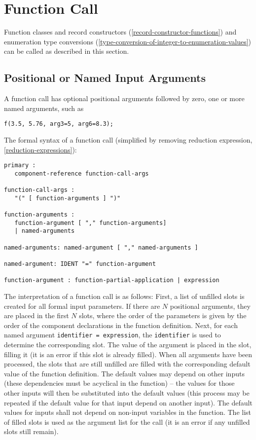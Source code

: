 \section{Function Call}\label{function-call}

Function classes and record constructors (\cref{record-constructor-functions}) and enumeration type
conversions (\cref{type-conversion-of-integer-to-enumeration-values}) can be called as described in this section.

\subsection{Positional or Named Input Arguments}\label{positional-or-named-input-arguments-of-functions}

A function call has optional positional arguments followed by zero, one
or more named arguments, such as

\begin{lstlisting}[language=modelica]
f(3.5, 5.76, arg3=5, arg6=8.3);
\end{lstlisting}

The formal syntax of a function call (simplified by removing reduction
expression, \cref{reduction-expressions}):
\begin{lstlisting}[language=grammar]
primary :
   component-reference function-call-args

function-call-args :
   "(" [ function-arguments ] ")"

function-arguments :
   function-argument [ "," function-arguments]
   | named-arguments

named-arguments: named-argument [ "," named-arguments ]

named-argument: IDENT "=" function-argument

function-argument : function-partial-application | expression
\end{lstlisting}

The interpretation of a function call is as follows: First, a list of unfilled slots is created for all formal input parameters.
If there are $N$ positional arguments, they are placed in the first $N$ slots, where the order of the parameters is given by the order of the component declarations in the function definition.
Next, for each named argument \lstinline!identifier = expression!, the \lstinline!identifier! is used to determine the corresponding slot.
The value of the argument is placed in the slot, filling it (it is an error if this slot is already filled).
When all arguments have been processed, the slots that are still unfilled are filled with the corresponding default value of the function definition.
The default values may depend on other inputs (these dependencies must be acyclical in the function) -- the values for those other inputs will then be substituted into the default values (this process may be repeated if the default value for that input depend on another input).
The default values for inputs shall not depend on non-input variables in the function.
The list of filled slots is used as the argument list for the call (it is an error if any unfilled slots still remain).

